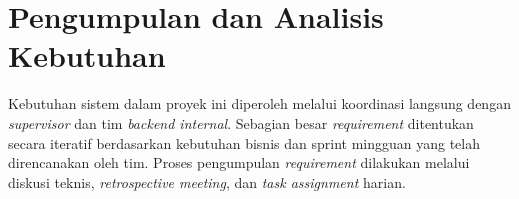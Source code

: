 


\section{Pengumpulan dan Analisis Kebutuhan}
Kebutuhan sistem dalam proyek ini diperoleh melalui koordinasi langsung dengan \textit{supervisor} dan tim \textit{backend internal}. Sebagian besar \textit{requirement} ditentukan secara iteratif berdasarkan kebutuhan bisnis dan sprint mingguan yang telah direncanakan oleh tim. Proses pengumpulan \textit{requirement} dilakukan melalui diskusi teknis, \textit{retrospective meeting}, dan \textit{task assignment} harian.

